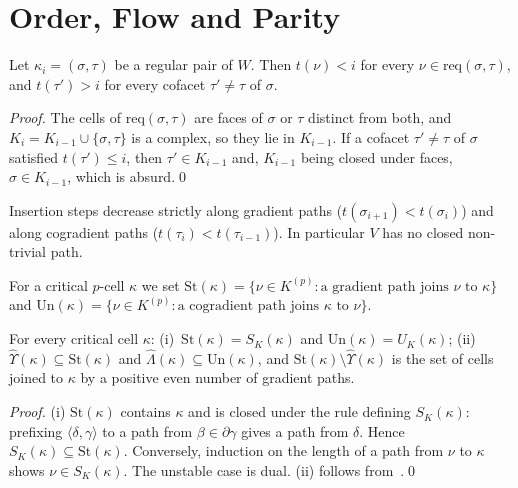 \documentclass[runningheads]{llncs}
\newcommand{\St}{\mathrm{St}}
\newcommand{\Un}{\mathrm{Un}}
\newcommand{\req}{\mathrm{req}}
\newcommand{\coext}{\widehat{\Upsilon}}
\newcommand{\ext}{\widehat{\Lambda}}
\begin{document}
\section{Order, Flow and Parity}\label{sec:flow}

\begin{lemma}[Order]\label{lem:order}
Let $\kappa_i=(\sigma,\tau)$ be a regular pair of $W$. Then $t(\nu)<i$ for
every $\nu\in\req(\sigma,\tau)$, and $t(\tau')>i$ for every cofacet
$\tau'\ne\tau$ of $\sigma$.
\end{lemma}

\begin{proof}
The cells of $\req(\sigma,\tau)$ are faces of $\sigma$ or $\tau$ distinct
from both, and $K_i=K_{i-1}\cup\{\sigma,\tau\}$ is a complex, so they lie
in $K_{i-1}$. If a cofacet $\tau'\ne\tau$ of $\sigma$ satisfied
$t(\tau')\le i$, then $\tau'\in K_{i-1}$ and, $K_{i-1}$ being closed under
faces, $\sigma\in K_{i-1}$, which is absurd.\qed
\end{proof}

\begin{corollary}\label{cor:decrease}
Insertion steps decrease strictly along gradient paths
($t(\sigma_{i+1})<t(\sigma_i)$) and along cogradient paths
($t(\tau_i)<t(\tau_{i-1})$). In particular $V$ has no closed non-trivial
path.
\end{corollary}

For a critical $p$-cell $\kappa$ we set
$\St(\kappa)=\{\nu\in K^{(p)}:\text{a gradient path joins }\nu\text{ to }\kappa\}$
and
$\Un(\kappa)=\{\nu\in K^{(p)}:\text{a cogradient path joins }\kappa\text{ to }\nu\}$.

\begin{proposition}\label{prop:stable}
For every critical cell $\kappa$:
(i)~$\St(\kappa)=S_K(\kappa)$ and $\Un(\kappa)=U_K(\kappa)$;
(ii)~$\coext(\kappa)\subseteq\St(\kappa)$ and $\ext(\kappa)\subseteq\Un(\kappa)$,
and $\St(\kappa)\setminus\coext(\kappa)$ is the set of cells joined to
$\kappa$ by a positive even number of gradient paths.
\end{proposition}

\begin{proof}
(i) $\St(\kappa)$ contains $\kappa$ and is closed under the rule defining
$S_K(\kappa)$: prefixing $\langle\delta,\gamma\rangle$ to a path from
$\beta\in\partial\gamma$ gives a path from $\delta$. Hence
$S_K(\kappa)\subseteq\St(\kappa)$. Conversely, induction on the length of a
path from $\nu$ to $\kappa$ shows $\nu\in S_K(\kappa)$. The unstable case is
dual. (ii) follows from~\cite[Th.~12]{Ber25a}.\qed
\end{proof}
\end{document}
